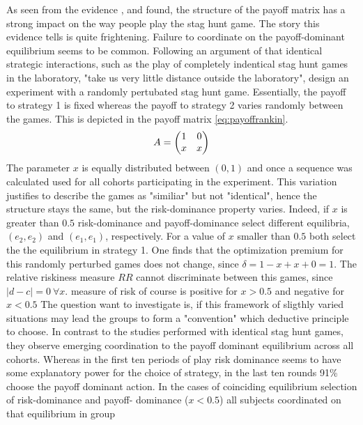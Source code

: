 \documentclass[12pt]{article}
\begin{document}
As seen from the evidence \textcite{battalio_optimization_2001},
\textcite{schmidt_playing_2003} and \textcite{dubois_optimization_2012} 
found, the structure of the payoff matrix has a strong impact on the way 
people play the stag hunt game.   
The story this evidence tells is quite frightening. Failure to coordinate 
on the payoff-dominant equilibrium seems to be common. Following an argument
of \textcite{kreps_game_1990} that identical strategic interactions, such
as the play of completely indentical stag hunt games in the laboratory,
"take us very little distance outside the laboratory", 
\textcite{rankin_strategic_2000} design an experiment with a randomly 
pertubated stag hunt game. Essentially, the payoff to strategy 1 is fixed 
whereas the payoff to strategy 2 varies randomly between the games. This is
depicted in the payoff matrix \eqref{eq:payoffrankin}.
\begin{align}
        \label{eq:payoffrankin}
        A = \mqty(1 & 0 \\ x & x)
\end{align}        
The parameter $x$ is equally distributed between $(0,1)$ and once a sequence
was calculated used for all cohorts participating in the experiment. This
variation justifies to describe the games as "similiar" but not
"identical", hence the structure stays the same, but the risk-dominance 
property varies. Indeed, if $x$ is greater than $0.5$ risk-dominance and
payoff-dominance select different equilibria, $(e_2,e_2)$ and $(e_1,e_1)$,
respectively. For a value of $x$ smaller than $0.5$ both select the 
the equilibrium in strategy 1. One finds that the optimization premium for 
this randomly perturbed games does not change, since $\delta=1-x+x+0=1$. 
The relative riskiness measure $RR$ cannot discriminate between this games,
since $|d-c|=0\ \forall x$. \cite{schmidt_playing_2003} measure of risk of 
course is positive for $x > 0.5$ and negative for $x <0.5$
The question \textcite{rankin_strategic_2000}
want to investigate is, if this framework of sligthly varied situations may
lead the groups to form a "convention" which deductive principle to choose. 
In contrast to the studies performed with identical stag hunt games, they 
observe emerging coordination to the payoff dominant equilibrium across
all cohorts. Whereas in the first ten periods of play risk dominance seems
to have some explanatory power for the choice of strategy, in the last ten
rounds 91\% choose the payoff dominant action. 
In the cases of coinciding equilibrium selection of risk-dominance and payoff-
dominance ($x < 0.5$) all subjects coordinated on that equilibrium in group
\end{document}
